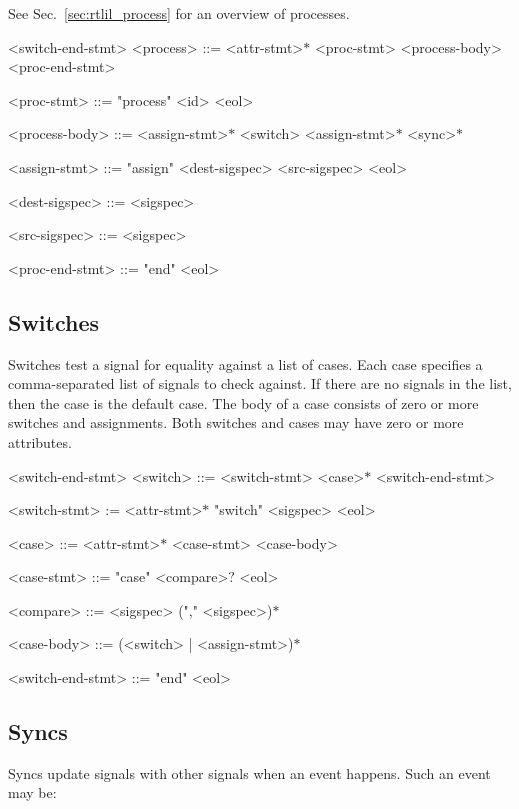 See Sec.~\ref{sec:rtlil_process} for an overview of processes.

\begin{indentgrammar}{<switch-end-stmt>}
<process> ::= <attr-stmt>$*$ <proc-stmt> <process-body> <proc-end-stmt>

<proc-stmt> ::= "process" <id> <eol>

<process-body> ::= <assign-stmt>$*$ <switch> <assign-stmt>$*$ <sync>$*$

<assign-stmt> ::= "assign" <dest-sigspec> <src-sigspec> <eol>

<dest-sigspec> ::= <sigspec>

<src-sigspec> ::= <sigspec>

<proc-end-stmt> ::= "end" <eol>

\end{indentgrammar}

\subsection{Switches}

Switches test a signal for equality against a list of cases. Each case specifies a comma-separated list of signals to check against. If there are no signals in the list, then the case is the default case. The body of a case consists of zero or more switches and assignments. Both switches and cases may have zero or more attributes.

\begin{indentgrammar}{<switch-end-stmt>}
<switch> ::= <switch-stmt> <case>$*$ <switch-end-stmt>

<switch-stmt> := <attr-stmt>$*$ "switch" <sigspec> <eol>

<case> ::= <attr-stmt>$*$ <case-stmt> <case-body>

<case-stmt> ::= "case" <compare>$?$ <eol>

<compare> ::= <sigspec> ("," <sigspec>)$*$

<case-body> ::= (<switch> | <assign-stmt>)$*$

<switch-end-stmt> ::= "end" <eol>
\end{indentgrammar}

\subsection{Syncs}

Syncs update signals with other signals when an event happens. Such an event may be:

